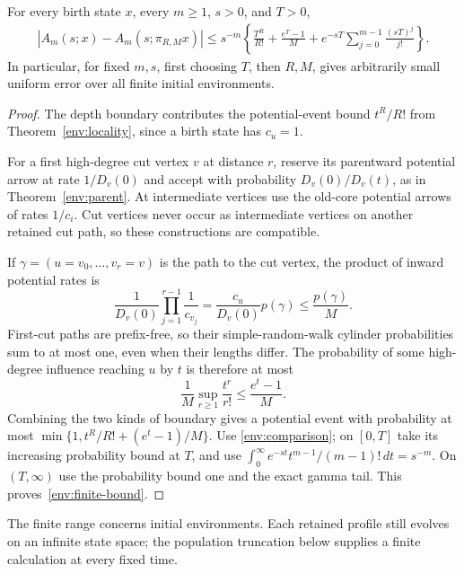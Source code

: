 \begin{theorem}
\label{env:finite-initial}
For every birth state $x$, every $m\ge1$, $s>0$, and $T>0$,
\begin{equation}\label{env:finite-bound}
\begin{split}
 |A_m(s;x)-A_m(s;\pi_{R,M}x)|
 \le s^{-m}\left\{
 \frac{T^R}{R!}+\frac{e^T-1}{M}
 +e^{-sT}\sum_{j=0}^{m-1}\frac{(sT)^j}{j!}
 \right\}.
\end{split}
\end{equation}
In particular, for fixed $m,s$, first choosing $T$, then $R,M$,
gives arbitrarily small uniform error over all finite initial environments.
\end{theorem}
\begin{proof}
The depth boundary contributes the potential-event bound $t^R/R!$
from Theorem~\ref{env:locality}, since a birth state has $c_u=1$.

For a first high-degree cut vertex $v$ at distance $r$, reserve its
parentward potential arrow at rate $1/D_v(0)$ and accept with probability
$D_v(0)/D_v(t)$, as in Theorem~\ref{env:parent}.
At intermediate vertices use the old-core potential arrows of rates
$1/c_i$. Cut vertices never occur as intermediate vertices on another
retained cut path, so these constructions are compatible.

If $\gamma=(u=v_0,\ldots,v_r=v)$ is the path to the cut vertex, the
product of inward potential rates is
\[
 \frac1{D_v(0)}\prod_{j=1}^{r-1}\frac1{c_{v_j}}
 =\frac{c_u}{D_v(0)}p(\gamma)
 \le\frac{p(\gamma)}{M}.
\]
First-cut paths are prefix-free, so their simple-random-walk cylinder
probabilities sum to at most one, even when their lengths differ.
The probability of some high-degree influence reaching $u$ by $t$ is
therefore at most
\[
 \frac1M\sup_{r\ge1}\frac{t^r}{r!}
 \le\frac{e^t-1}{M}.
\]
Combining the two kinds of boundary gives a potential event with
probability at most
$\min\{1,t^R/R!+(e^t-1)/M\}$.
Use \eqref{env:comparison}; on $[0,T]$ take its increasing probability
bound at $T$, and use $\int_0^\infty e^{-st}t^{m-1}/(m-1)!\,dt=s^{-m}$.
On $(T,\infty)$ use the probability bound one and the exact gamma tail.
This proves~\eqref{env:finite-bound}.
\end{proof}

The finite range concerns initial environments. Each retained profile still evolves on an infinite state space; the population truncation below supplies a finite calculation at every fixed time.

